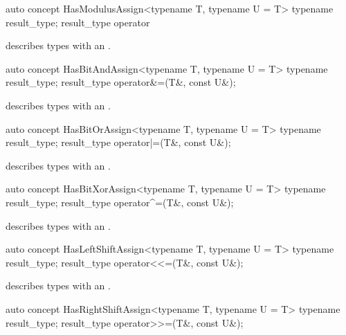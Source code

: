 \documentclass[american,twoside]{book}
\begin{document}
\begin{itemdecl}
auto concept HasModulusAssign<typename T, typename U = T> {
  typename result_type;
  result_type operator%
}
\end{itemdecl}

\begin{itemdescr}
\pnum
\mbox{\reallynote} describes types with an \mbox{}.
\end{itemdescr}

\begin{itemdecl}
auto concept HasBitAndAssign<typename T, typename U = T> {
  typename result_type;
  result_type operator&=(T&, const U&);
}
\end{itemdecl}

\begin{itemdescr}
\pnum
\mbox{\reallynote} describes types with an \mbox{}.
\end{itemdescr}

\begin{itemdecl}
auto concept HasBitOrAssign<typename T, typename U = T> {
  typename result_type;
  result_type operator|=(T&, const U&);
}
\end{itemdecl}

\begin{itemdescr}
\pnum
\mbox{\reallynote} describes types with an \mbox{}.
\end{itemdescr}

\begin{itemdecl}
auto concept HasBitXorAssign<typename T, typename U = T> {
  typename result_type;
  result_type operator^=(T&, const U&);
}
\end{itemdecl}

\begin{itemdescr}
\pnum
\mbox{\reallynote} describes types with an \mbox{}.
\end{itemdescr}

\begin{itemdecl}
auto concept HasLeftShiftAssign<typename T, typename U = T> {
  typename result_type;
  result_type operator<<=(T&, const U&);
}
\end{itemdecl}

\begin{itemdescr}
\pnum
\mbox{\reallynote} describes types with an \mbox{}.
\end{itemdescr}

\begin{itemdecl}
auto concept HasRightShiftAssign<typename T, typename U = T> {
  typename result_type;
  result_type operator>>=(T&, const U&);
}
\end{itemdecl}
\end{document}
